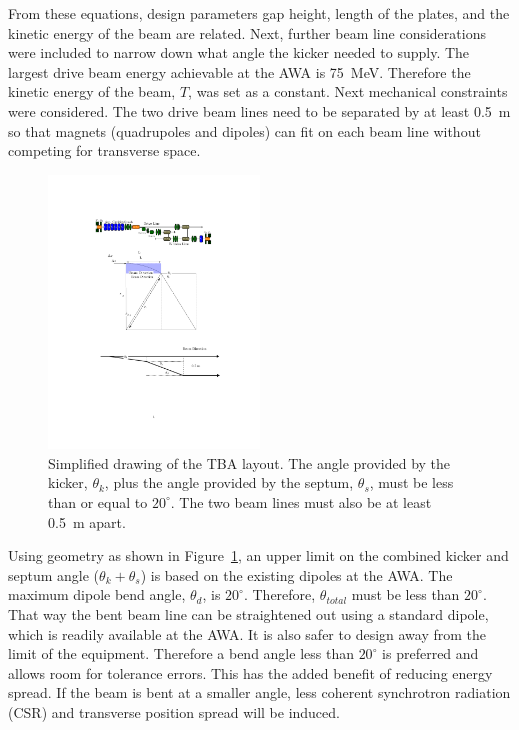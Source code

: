 \documentclass[aps,prab,preprint,groupedaddress,linenumbers]{revtex4-2}
\begin{document}
From these equations, design parameters gap height, length of the plates, and 
the kinetic energy of the beam are related. Next, further beam line considerations were included 
to narrow down what angle the kicker needed to supply. 
The largest drive beam energy achievable at the AWA is \SI{75}{MeV}. 
Therefore the kinetic energy of the beam, $T$, was set as a constant.
Next mechanical constraints were considered. The two drive beam lines need to be separated
by at least \SI{0.5}{m} so that magnets (quadrupoles and dipoles) can fit on each 
beam line without competing for transverse space. 
\begin{figure}
\includegraphics[width=0.5\textwidth]{tba_geometry}
	\caption{Simplified drawing of the TBA layout. 
		The angle provided by the kicker, $\theta_k$, plus the angle provided by the septum, $\theta_s$,
		must be less than or equal to $20^\circ$.
		The two beam lines must also be at least \SI{0.5}{m} apart.}\label{fig:triangle}
\end{figure}

Using geometry as shown in Figure~\ref{fig:triangle}, an upper limit on the 
combined kicker and septum angle ($\theta_k+\theta_s$) is based on the existing dipoles at the AWA.
The maximum dipole bend angle, $\theta_d$, is $20^\circ$. 
Therefore, $\theta_{total}$  must be less than $20^\circ$. 
That way the bent beam line can be straightened out using a standard dipole, 
which is readily available at the AWA. 
It is also safer to design away from the limit of the equipment. 
Therefore a bend angle less than $20^\circ$ is preferred and allows room for tolerance errors. 
This has the added benefit of reducing energy spread. 
If the beam is bent at a smaller angle, 
less coherent synchrotron radiation (CSR) and transverse position spread will be induced.
\end{document}
